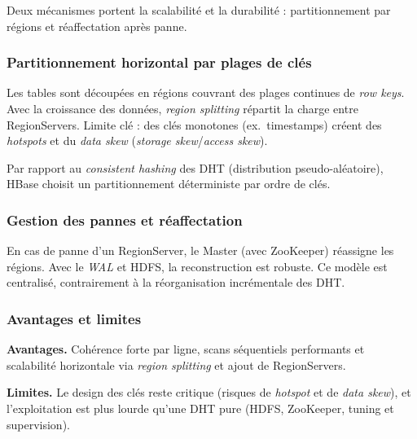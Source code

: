 Deux m\'ecanismes portent la scalabilit\'e et la durabilit\'e : partitionnement par r\'egions et r\'eaffectation apr\`es panne.

\subsubsection*{Partitionnement horizontal par plages de cl\'es}

Les tables sont d\'ecoup\'ees en r\'egions couvrant des plages continues de \emph{row keys}. Avec la croissance des donn\'ees, \emph{region splitting} r\'epartit la charge entre RegionServers. Limite cl\'e : des cl\'es monotones (ex.~timestamps) cr\'eent des \emph{hotspots} et du \emph{data skew} (\emph{storage skew}/\emph{access skew}).

Par rapport au \emph{consistent hashing} des DHT (distribution pseudo-al\'eatoire), HBase choisit un partitionnement d\'eterministe par ordre de cl\'es.

\subsubsection*{Gestion des pannes et r\'eaffectation}

En cas de panne d'un RegionServer, le Master (avec ZooKeeper) r\'eassigne les r\'egions. Avec le \emph{WAL} et HDFS, la reconstruction est robuste. Ce mod\`ele est centralis\'e, contrairement \`a la r\'eorganisation incr\'ementale des DHT.


\subsubsection{Avantages et limites}

\textbf{Avantages.} Coh\'erence forte par ligne, scans s\'equentiels performants et scalabilit\'e horizontale via \emph{region splitting} et ajout de RegionServers.

\textbf{Limites.} Le design des cl\'es reste critique (risques de \emph{hotspot} et de \emph{data skew}), et l'exploitation est plus lourde qu'une DHT pure (HDFS, ZooKeeper, tuning et supervision).